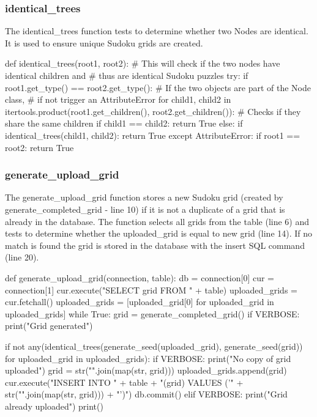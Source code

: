 \documentclass[fleqn]{article}
\begin{document}
\subsubsection{identical\_trees}

The identical\_trees function tests to determine whether two Nodes are identical. It is used to ensure unique Sudoku grids are created.

\begin{python}
def identical_trees(root1, root2):  # This will check if the two nodes have identical children and
    # thus are identical Sudoku puzzles
    try:
        if root1.get_type() == root2.get_type():  # If the two objects are part of the Node class,
            #  if not trigger an AttributeError
            for child1, child2 in itertools.product(root1.get_children(), root2.get_children()):
                # Checks if they share the same children
                if child1 == child2:
                    return True
                else:
                    if identical_trees(child1, child2):
                        return True
    except AttributeError:
        if root1 == root2:
            return True
\end{python}

\subsubsection{generate\_upload\_grid}

The generate\_upload\_grid function stores a new Sudoku grid (created by generate\_completed\_grid - line 10) if it is not a duplicate of a grid that is already in the database. The function selects all grids from the table (line 6) and tests to determine whether the uploaded\_grid is equal to new grid (line 14). If no match is found the grid is stored in the database with the insert SQL command (line 20).


\begin{python}
def generate_upload_grid(connection, table):
    db = connection[0]
    cur = connection[1]
    cur.execute("SELECT grid FROM " + table)
    uploaded_grids = cur.fetchall()
    uploaded_grids = [uploaded_grid[0] for uploaded_grid in uploaded_grids]
    while True:
        grid = generate_completed_grid()
        if VERBOSE:
            print("Grid generated")

        if not any(identical_trees(generate_seed(uploaded_grid), generate_seed(grid))
                   for uploaded_grid in uploaded_grids):
            if VERBOSE:
                print("No copy of grid uploaded")
            grid = str("".join(map(str, grid)))
            uploaded_grids.append(grid)
            cur.execute("INSERT INTO " + table + "(grid) VALUES ('" + str("".join(map(str, grid))) + "')")
            db.commit()
        elif VERBOSE:
            print("Grid already uploaded")
            print()
\end{python}
\end{document}
